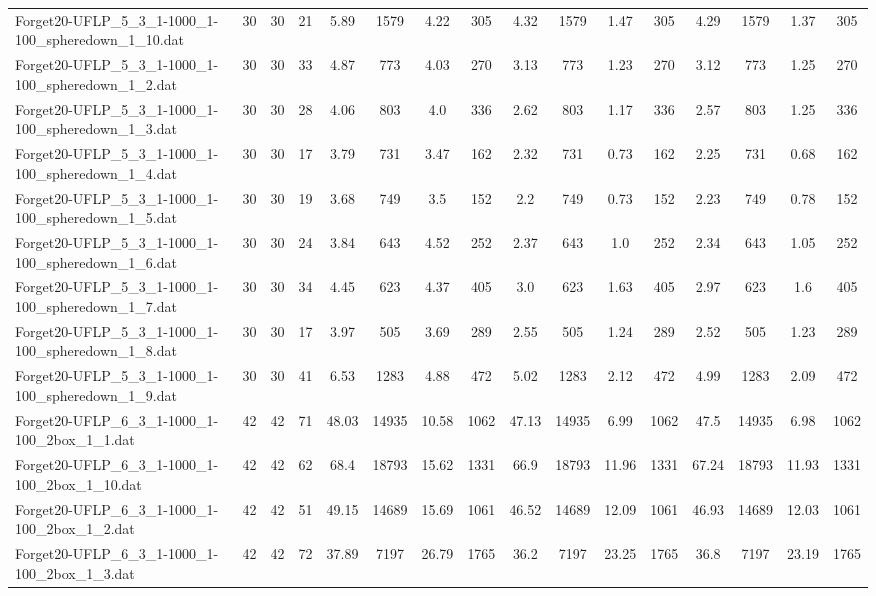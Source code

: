 \begin{sidewaystable}[!ht]
{\begin{tabular}{lccccccccccccccc}
Forget20-UFLP\_5\_3\_1-1000\_1-100\_spheredown\_1\_10.dat & 30 & 30 & 21 & 5.89 & 1579 & 4.22 & 305 & 4.32 & 1579 & 1.47 & 305 & 4.29 & 1579 &  \textcolor{blue2}{1.37} & 305 \\
Forget20-UFLP\_5\_3\_1-1000\_1-100\_spheredown\_1\_2.dat & 30 & 30 & 33 & 4.87 & 773 & 4.03 & 270 & 3.13 & 773 & 1.23 & 270 & 3.12 & 773 & 1.25 & 270 \\
Forget20-UFLP\_5\_3\_1-1000\_1-100\_spheredown\_1\_3.dat & 30 & 30 & 28 & 4.06 & 803 & 4.0 & 336 & 2.62 & 803 &  \textcolor{blue2}{1.17} & 336 & 2.57 & 803 & 1.25 & 336 \\
Forget20-UFLP\_5\_3\_1-1000\_1-100\_spheredown\_1\_4.dat & 30 & 30 & 17 & 3.79 & 731 & 3.47 & 162 & 2.32 & 731 & 0.73 & 162 & 2.25 & 731 &  \textcolor{blue2}{0.68} & 162 \\
Forget20-UFLP\_5\_3\_1-1000\_1-100\_spheredown\_1\_5.dat & 30 & 30 & 19 & 3.68 & 749 & 3.5 & 152 & 2.2 & 749 &  \textcolor{blue2}{0.73} & 152 & 2.23 & 749 & 0.78 & 152 \\
Forget20-UFLP\_5\_3\_1-1000\_1-100\_spheredown\_1\_6.dat & 30 & 30 & 24 & 3.84 & 643 & 4.52 & 252 & 2.37 & 643 &  \textcolor{blue2}{1.0} & 252 & 2.34 & 643 & 1.05 & 252 \\
Forget20-UFLP\_5\_3\_1-1000\_1-100\_spheredown\_1\_7.dat & 30 & 30 & 34 & 4.45 & 623 & 4.37 & 405 & 3.0 & 623 & 1.63 & 405 & 2.97 & 623 & 1.6 & 405 \\
Forget20-UFLP\_5\_3\_1-1000\_1-100\_spheredown\_1\_8.dat & 30 & 30 & 17 & 3.97 & 505 & 3.69 & 289 & 2.55 & 505 & 1.24 & 289 & 2.52 & 505 & 1.23 & 289 \\
Forget20-UFLP\_5\_3\_1-1000\_1-100\_spheredown\_1\_9.dat & 30 & 30 & 41 & 6.53 & 1283 & 4.88 & 472 & 5.02 & 1283 & 2.12 & 472 & 4.99 & 1283 & 2.09 & 472 \\
Forget20-UFLP\_6\_3\_1-1000\_1-100\_2box\_1\_1.dat & 42 & 42 & 71 & 48.03 & 14935 & 10.58 & 1062 & 47.13 & 14935 & 6.99 & 1062 & 47.5 & 14935 & 6.98 & 1062 \\
Forget20-UFLP\_6\_3\_1-1000\_1-100\_2box\_1\_10.dat & 42 & 42 & 62 & 68.4 & 18793 & 15.62 & 1331 & 66.9 & 18793 & 11.96 & 1331 & 67.24 & 18793 & 11.93 & 1331 \\
Forget20-UFLP\_6\_3\_1-1000\_1-100\_2box\_1\_2.dat & 42 & 42 & 51 & 49.15 & 14689 & 15.69 & 1061 & 46.52 & 14689 & 12.09 & 1061 & 46.93 & 14689 & 12.03 & 1061 \\
Forget20-UFLP\_6\_3\_1-1000\_1-100\_2box\_1\_3.dat & 42 & 42 & 72 & 37.89 & 7197 & 26.79 & 1765 & 36.2 & 7197 & 23.25 & 1765 & 36.8 & 7197 & 23.19 & 1765 \\

\end{tabular}}
\end{sidewaystable}
